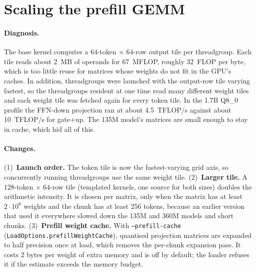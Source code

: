 \documentclass[10pt,twocolumn]{article}
\begin{document}
\section{Scaling the prefill GEMM}
\label{sec:scaling}
\paragraph{Diagnosis.} The base kernel computes a $64$-token $\times$ $64$-row output tile per threadgroup. Each tile reads about 2~MB of operands for 67~MFLOP, roughly 32~FLOP per byte, which is too little reuse for matrices whose weights do not fit in the GPU's caches. In addition, threadgroups were launched with the output-row tile varying fastest, so the threadgroups resident at one time read many different weight tiles and each weight tile was fetched again for every token tile. In the 1.7B Q8\_0 profile the FFN-down projection ran at about 4.5~TFLOP/s against about 10~TFLOP/s for gate+up. The 135M model's matrices are small enough to stay in cache, which hid all of this.

\paragraph{Changes.} (1)~\textbf{Launch order.} The token tile is now the fastest-varying grid axis, so concurrently running threadgroups use the same weight tile. (2)~\textbf{Larger tile.} A $128$-token $\times$ $64$-row tile (templated kernels, one source for both sizes) doubles the arithmetic intensity. It is chosen per matrix, only when the matrix has at least $2\cdot10^{6}$ weights and the chunk has at least 256 tokens, because an earlier version that used it everywhere slowed down the 135M and 360M models and short chunks. (3)~\textbf{Prefill weight cache.} With \texttt{--prefill-cache} (\texttt{LoadOptions.prefillWeightCache}), quantised projection matrices are expanded to half precision once at load, which removes the per-chunk expansion pass. It costs 2 bytes per weight of extra memory and is off by default; the loader refuses it if the estimate exceeds the memory budget.
\end{document}
